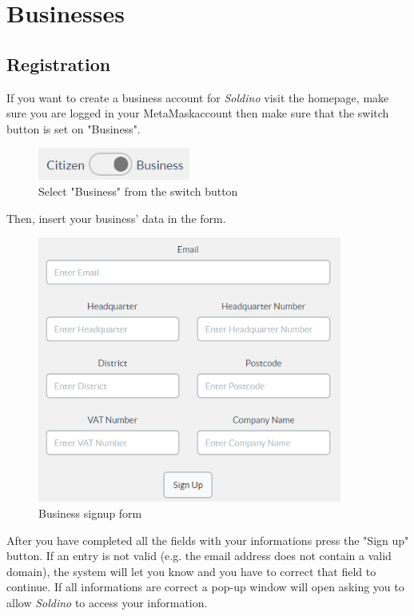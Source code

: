 \section{Businesses}
	\subsection{Registration}
	If you want to create a business account for \textit{Soldino} visit the 
	homepage, make sure you are logged in your MetaMask\glosp account
	then make sure that the switch button is set on "Business".\\
	\begin{figure}[H]
		\includegraphics[width=5cm]{res/images/user_business.png}
		\centering
		\caption{Select "Business" from the switch button}
	\end{figure}	
	\noindent Then, insert your business' data in the form.
	\begin{figure}[H]
		\includegraphics[width=10cm]{res/images/business_signup.png}
		\centering
		\caption{Business signup form}
	\end{figure}
	\noindent After you have completed 
	all the	fields with your informations press the "Sign up" button. If an 
	entry is not valid (e.g. the email address does not contain a valid 
	domain), the system will let you know and you have to correct that field 
	to continue. If all informations are correct a pop-up window will open 
	asking you to allow \textit{Soldino} to access your information.\\

